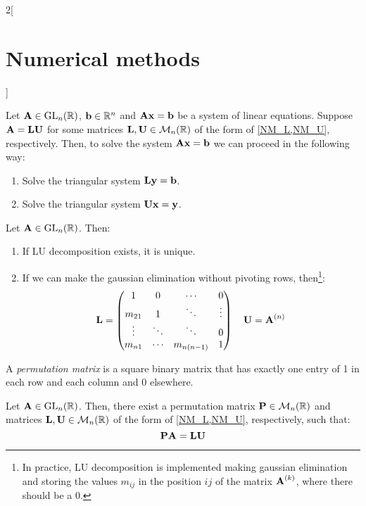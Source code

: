 \documentclass[../../../main_math.tex]{subfiles}
\begin{document}
\begin{multicols}{2}[\section{Numerical methods}]
\begin{lemma}
    Let $\boldsymbol{\mathrm{A}}\in\mathrm{GL}_n(\mathbb{R})$, $\boldsymbol{\mathrm{b}}\in\mathbb{R}^n$ and $\boldsymbol{\mathrm{A}}\boldsymbol{\mathrm{x}}=\boldsymbol{\mathrm{b}}$ be a system of linear equations. Suppose $\boldsymbol{\mathrm{A}}=\boldsymbol{\mathrm{L}}\boldsymbol{\mathrm{U}}$ for some matrices $\boldsymbol{\mathrm{L}},\boldsymbol{\mathrm{U}}\in\mathcal{M}_n(\mathbb{R})$ of the form of \cref{NM_L,NM_U}, respectively. Then, to solve the system $\boldsymbol{\mathrm{A}}\boldsymbol{\mathrm{x}}=\boldsymbol{\mathrm{b}}$ we can proceed in the following way:
    \begin{enumerate}
      \item Solve the triangular system $\boldsymbol{\mathrm{L}}\boldsymbol{\mathrm{y}}=\boldsymbol{\mathrm{b}}$.
      \item Solve the triangular system $\boldsymbol{\mathrm{U}}\boldsymbol{\mathrm{x}}=\boldsymbol{\mathrm{y}}$.
    \end{enumerate}
  \end{lemma}
  \begin{proposition}
    Let $\boldsymbol{\mathrm{A}}\in\mathrm{GL}_n(\mathbb{R})$. Then:
    \begin{enumerate}
      \item If LU decomposition exists, it is unique.
      \item If we can make the gaussian elimination without pivoting rows, then\footnote{In practice, LU decomposition is implemented making gaussian elimination and storing the values $m_{ij}$ in the position $ij$ of the matrix $\boldsymbol{\mathrm{A}}^{(k)}$, where there should be a 0.}:
            $$
              \boldsymbol{\mathrm{L}}=
              \begin{pmatrix}
                1      & 0      & \cdots     & 0      \\
                m_{21} & 1      & \ddots     & \vdots \\
                \vdots & \ddots & \ddots     & 0      \\
                m_{n1} & \cdots & m_{n(n-1)} & 1
              \end{pmatrix}\quad
              \boldsymbol{\mathrm{U}}=\boldsymbol{\mathrm{A}}^{(n)}
            $$
    \end{enumerate}
  \end{proposition}
  \begin{definition}
    A \emph{permutation matrix} is a square binary matrix that has exactly one entry of 1 in each row and each column and 0 elsewhere.
  \end{definition}
  \begin{proposition}
    Let $\boldsymbol{\mathrm{A}}\in\mathrm{GL}_n(\mathbb{R})$. Then, there exist a permutation matrix $\boldsymbol{\mathrm{P}}\in\mathcal{M}_n(\mathbb{R})$ and matrices $\boldsymbol{\mathrm{L}},\boldsymbol{\mathrm{U}}\in\mathcal{M}_n(\mathbb{R})$ of the form of \cref{NM_L,NM_U}, respectively, such that: $$\boldsymbol{\mathrm{P}}\boldsymbol{\mathrm{A}}=\boldsymbol{\mathrm{L}}\boldsymbol{\mathrm{U}}$$
  \end{proposition}
  \begin{definition}[QR descompostion]

\end{definition}
\end{multicols}
\end{document}
